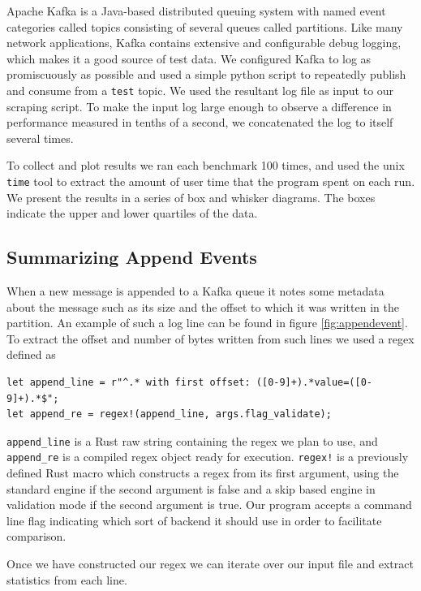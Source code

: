 Apache Kafka is a Java-based distributed queuing system with
named event categories called topics consisting of several
queues called partitions. Like many network applications,
Kafka contains extensive and configurable debug logging,
which makes it a good source of test data. We configured
Kafka to log as promiscuously as possible and used a simple
python script to repeatedly publish and consume from a 
\verb'test' topic. We used the resultant log file as input
to our scraping script. To make the input log large enough
to observe a difference in performance measured in tenths of
a second, we concatenated the log to itself several times.

To collect and plot results we ran each benchmark 100
times, and used the unix \verb'time' tool to extract
the amount of user time that the program spent on each
run. We present the results in a series of box and whisker
diagrams. The boxes indicate the upper and lower quartiles
of the data.

\subsection{Summarizing Append Events}

When a new message is appended to a Kafka queue it notes some
metadata about the message such as its size and the offset to
which it was written in the partition. An example of such a log
line can be found in figure \ref{fig:appendevent}. To extract
the offset and number of bytes written from such lines we
used a regex defined as

\begin{verbatim}
let append_line = r"^.* with first offset: ([0-9]+).*value=([0-9]+).*$";
let append_re = regex!(append_line, args.flag_validate);
\end{verbatim}

\verb'append_line' is a Rust raw string containing the regex we
plan to use, and \verb'append_re' is a compiled regex object ready for
execution. \verb'regex!' is a previously defined Rust macro which
constructs a regex from its first argument, using the standard engine
if the second argument is false and a skip based engine in validation
mode if the second argument is true. Our program accepts a command
line flag indicating which sort of backend it should use in order
to facilitate comparison.

Once we have constructed our regex we can iterate over our input
file and extract statistics from each line.

